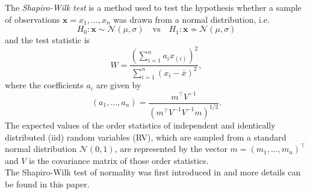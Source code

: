 
The \textit{Shapiro-Wilk test} is a method used to test the hypothesis whether a sample of observations $ \bm{x} = x_1, \ldots, x_n$ was drawn from a normal distribution, i.e.
$$
H_0: \bm{x} \sim \mathcal{N}(\mu, \sigma) \quad \text{vs} \quad H_1: \bm{x} \nsim \mathcal{N}(\mu, \sigma)
$$
and the test statistic is
$$
W=\frac{\left(\sum_{i=1}^{n} a_{i} x_{(i)}\right)^{2}}{\sum_{i=1}^{n}\left(x_{i}-\bar{x}\right)^{2}},
$$
where the coefficients $a_i$ are given by 
$$
\left(a_{1}, \ldots, a_{n}\right)=\frac{m^{\top} V^{-1}}{\left(m^{\top} V^{-1} V^{-1} m\right)^{1 / 2}}.
$$
The expected values of the order statistics of independent and identically distributed (iid) random variables (RV), which are sampled from a standard normal distribution $\mathcal{N}(0,1)$, are represented by the vector $m=\left(m_{1}, \dots, m_{n}\right)^{\top}$ and $V$ is the covariance matrix of those order statistics.\\
The Shapiro-Wilk test of normality was first introduced in \cite{shapiro1965analysis} and more details can be found in this paper.


















